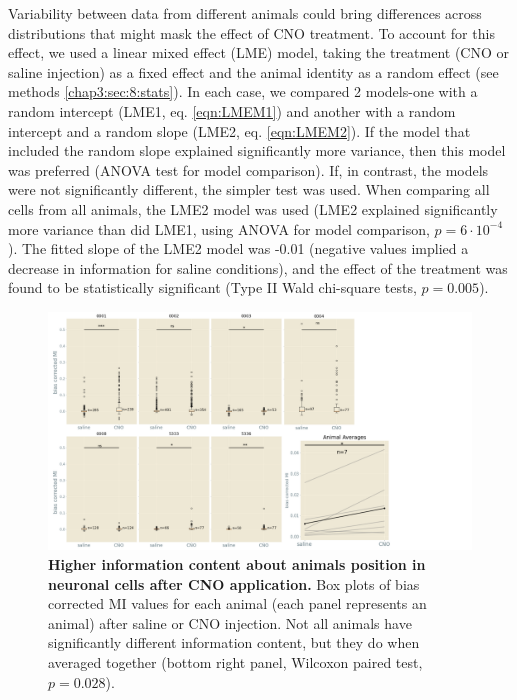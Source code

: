 Variability between data from different animals could bring differences across distributions that might mask the effect of CNO treatment. 
To account for this effect, we used a linear mixed effect (LME) model, taking the treatment (CNO or saline injection) as a fixed effect and the animal identity as a random effect (see methods \ref{chap3:sec:8:stats}).
In each case, we compared 2 models-one with a random intercept (LME1, eq. \ref{eqn:LMEM1}) and another with a random intercept and a random slope (LME2, eq. \ref{eqn:LMEM2}). 
If the model that included the random slope explained significantly more variance, then this model was preferred (ANOVA test for model comparison).
If, in contrast, the models were not significantly different, the simpler test was used.
When comparing all cells from all animals, the LME2 model was used (LME2 explained significantly more variance than did LME1, using ANOVA for model comparison, $p=6\cdot 10^{-4}$).
The fitted slope of the LME2 model was -0.01 (negative values implied a decrease in information for saline conditions), and the effect of the treatment was found to be statistically significant (Type II Wald chi-square tests, $p=0.005$).
\begin{figure}[h]
    \centering
    \includegraphics[trim={0 0 160 0}, clip, width=\textwidth]{Figures/Chapter4/MI_C_all_cells_2p.pdf}
    \caption[Higher information content about animals position in neuronal cells after CNO application]{\textbf{Higher information content about animals position in neuronal cells after CNO application.} 
    Box plots of bias corrected MI values for each animal (each panel represents an animal) after saline or CNO injection. 
    Not all animals have significantly different information content, but they do when averaged together (bottom right panel, Wilcoxon paired test, $p = 0.028$).}
    \label{fig:chap4:MI_C_2p}
\end{figure}

